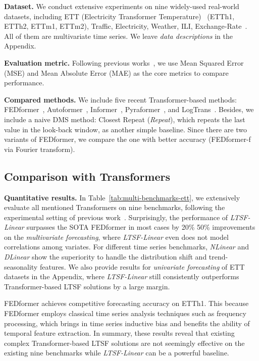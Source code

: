 \documentclass[10pt,twocolumn,letterpaper]{article}
\newcommand{\modelname}{\emph{LTSF-Linear}\xspace}
\begin{document}
\textbf{Dataset.} We conduct extensive experiments on nine widely-used real-world datasets, including ETT (Electricity Transformer Temperature)~\cite{informer} (ETTh1, ETTh2, ETTm1, ETTm2), Traffic, Electricity, Weather, ILI, Exchange-Rate~\cite{GuokunLai2017lstm}. All of them are multivariate time series. We leave \emph{data descriptions} in the Appendix.



\textbf{Evaluation metric.}
Following previous works~\cite{informer,xu2021autoformer,zhou2022fedformer}, we use Mean Squared Error (MSE) and Mean Absolute Error (MAE) as the core metrics to compare performance. 


\textbf{Compared methods.} We include five recent Transformer-based methods: FEDformer~\cite{zhou2022fedformer}, Autoformer~\cite{xu2021autoformer}, Informer~\cite{informer}, Pyraformer~\cite{liu2021pyraformer}, and LogTrans~\cite{li2019LogTrans}. 
Besides, we include a naive DMS method: Closest Repeat (\emph{Repeat}), which repeats the last value in the look-back window, as another simple baseline. Since there are two variants of FEDformer, we compare the one with better accuracy (FEDformer-f via Fourier transform). 



\subsection{Comparison with Transformers}


\textbf{Quantitative results.} In Table~\ref{tab:multi-benchmarks-ett}, we extensively evaluate all mentioned Transformers on nine benchmarks, following the experimental setting of previous work~\cite{xu2021autoformer,zhou2022fedformer,informer}.
Surprisingly, the performance of \modelname surpasses the SOTA FEDformer in most cases by 20\%  50\% improvements on the \emph{multivariate forecasting}, where \modelname even does not model correlations among variates. For different time series benchmarks, \emph{NLinear} and \emph{DLinear} show the superiority to handle the distribution shift and trend-seasonality features.
We also provide results for \emph{univariate forecasting} of ETT datasets in the Appendix, where \modelname still consistently outperforms Transformer-based LTSF solutions by a large margin.


FEDformer achieves competitive forecasting accuracy on ETTh1. This because FEDformer employs classical time series analysis techniques such as frequency processing, which brings in time series inductive bias and benefits the ability of temporal feature extraction. 
In summary, these results reveal that existing complex Transformer-based LTSF solutions are not seemingly effective on the existing nine benchmarks while \modelname can be a powerful baseline. 
\end{document}
